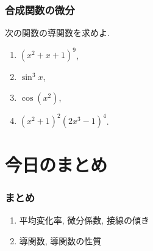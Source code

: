 \begin{frame}
\frametitle{合成関数の微分}


\begin{Prob}
次の関数の導関数を求めよ. 
\begin{enumerate}
\item $(x^2+x+1)^9$, 
\item $\sin^3 x$, 
\item $\cos( x^2)$, 
\item $(x^2+1)^2(2x^3-1)^4$. 
\end{enumerate}
\end{Prob}


\end{frame}



\section{今日のまとめ}
\begin{frame}
\frametitle{まとめ}   


\begin{enumerate}
\item 平均変化率, 微分係数, 接線の傾き
\item 導関数, 導関数の性質
\end{enumerate} 


\end{frame}
